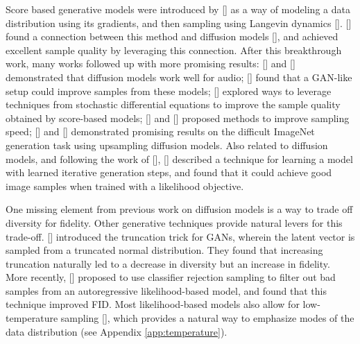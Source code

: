\documentclass{article}
\newcommand{\shortcite}[1]{[\citenum{#1}]}
\newcommand{\namecite}[1]{\citeauthor{#1} [\citenum{#1}]}
\begin{document}
Score based generative models were introduced by \namecite{scorematching} as a way of modeling a data distribution using its gradients, and then sampling using Langevin dynamics \shortcite{langevin}. \namecite{ddpm} found a connection between this method and diffusion models \shortcite{dickstein}, and achieved excellent sample quality by leveraging this connection. After this breakthrough work, many works followed up with more promising results: \namecite{diffwave} and \namecite{wavegrad} demonstrated that diffusion models work well for audio; \namecite{adversarial} found that a GAN-like setup could improve samples from these models; \namecite{sde} explored ways to leverage techniques from stochastic differential equations to improve the sample quality obtained by score-based models; \namecite{ddim} and \namecite{improved} proposed methods to improve sampling speed; \namecite{improved} and \namecite{sr3} demonstrated promising results on the difficult ImageNet generation task using upsampling diffusion models. Also related to diffusion models, and following the work of \namecite{dickstein}, \namecite{variationalwalkback} described a technique for learning a model with learned iterative generation steps, and found that it could achieve good image samples when trained with a likelihood objective.

One missing element from previous work on diffusion models is a way to trade off diversity for fidelity. Other generative techniques provide natural levers for this trade-off. \namecite{biggan} introduced the truncation trick for GANs, wherein the latent vector is sampled from a truncated normal distribution. They found that increasing truncation naturally led to a decrease in diversity but an increase in fidelity. More recently, \namecite{vqvae2} proposed to use classifier rejection sampling to filter out bad samples from an autoregressive likelihood-based model, and found that this technique improved FID. Most likelihood-based models also allow for low-temperature sampling \shortcite{temperature}, which provides a natural way to emphasize modes of the data distribution (see Appendix \ref{app:temperature}).
\end{document}
